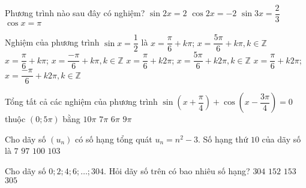 \begin{ex}%
	Phương trình nào sau đây có nghiệm?
	\choice
	{$\sin2x=2$}
	{$\cos2x=-2$}
	{\True $\sin3x=\dfrac{2}{3}$}
	{$\cos x =\pi$}
\end{ex}
\begin{ex}%
	Nghiệm của phương trình $\sin x=\dfrac{1}{2}$ là
	\choice
	{$x=\dfrac{\pi}{6}+k\pi$; $x=\dfrac{5\pi}{6}+k\pi,k\in\mathbb{Z}$}
	{$x=\dfrac{\pi}{6}+k\pi$; $x=\dfrac{-\pi}{6}+k\pi,k\in\mathbb{Z}$}
	{\True $x=\dfrac{\pi}{6}+k2\pi$; $x=\dfrac{5\pi}{6}+k2\pi,k\in\mathbb{Z}$}
	{$x=\dfrac{\pi}{6}+k2\pi$; $x=\dfrac{-\pi}{6}+k2\pi,k\in\mathbb{Z}$}
\end{ex}
\begin{ex}%
	Tổng tất cả các nghiệm của phương trình $\sin\left(x+\dfrac{\pi}{4}\right)+\cos\left(x-\dfrac{3\pi}{4}\right)=0$ thuộc $\left(0;5\pi\right)$ bằng
	\choice
	{\True $10\pi$}
	{$7\pi$}
	{$6\pi$}
	{$9\pi$}
\end{ex}
\begin{ex}%
	Cho dãy số $\left(u_{n}\right)$ có số hạng tổng quát $u_{n}=n^2-3$. Số hạng thứ $10$ của dãy số là
	\choice
	{$7$}
	{\True $97$}
	{$100$}
	{$103$}
\end{ex}
\begin{ex}%
	Cho dãy số $0;2;4;6;\ldots;304$. Hỏi dãy số trên có bao nhiêu số hạng?
	\choice
	{$304$}
	{$152$}
	{\True $153$}
	{$305$}
\end{ex}
